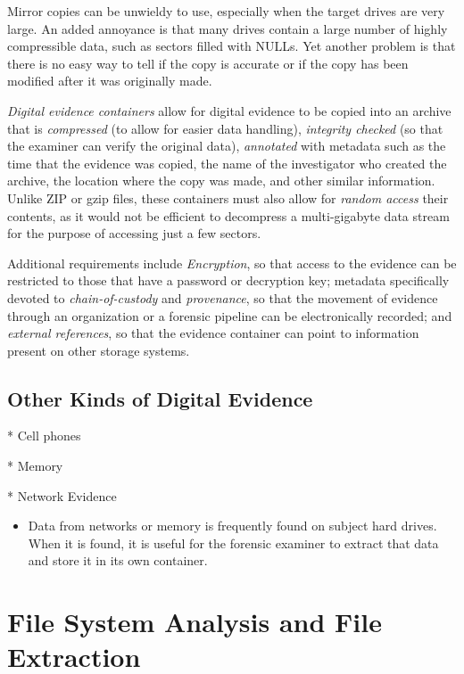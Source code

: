 \documentclass[11pt,letter]{article}
\begin{document}
Mirror copies can be unwieldy to use, especially when the target
drives are very large. An added annoyance is that many drives contain
a large number of highly compressible data, such as sectors filled
with NULLs. Yet another problem is that there is no easy way to tell
if the copy is accurate or if the copy has been modified after it was
originally made.

\emph{Digital evidence containers} allow for digital evidence to be
copied into an archive that is \emph{compressed} (to allow for easier
data handling), \emph{integrity checked} (so that the examiner can
verify the original data), \emph{annotated} with metadata such as the
time that the evidence was copied, the name of the investigator who
created the archive, the location where the copy was made, and other
similar information. Unlike ZIP or gzip files, these containers must
also allow for \emph{random access} their contents, as it would not be
efficient to decompress a multi-gigabyte data stream for the purpose
of accessing just a few sectors.

Additional requirements include \emph{Encryption}, so that access to
the evidence can be restricted to those that have a password or
decryption key; metadata specifically devoted to
\emph{chain-of-custody} and \emph{provenance}, so that the movement of
evidence through an organization or a forensic pipeline can be
electronically recorded; and \emph{external references}, so that the
evidence container can point to information present on other storage
systems.

\subsection{Other Kinds of Digital Evidence}

* Cell phones

* Memory

* Network Evidence

\begin{itemize}
\item Data from networks or memory is frequently found on subject hard
  drives. When it is found, it is useful for the forensic examiner to
  extract that data and store it in its own container. 
\end{itemize}


\section{File System Analysis and File Extraction}
\end{document}
